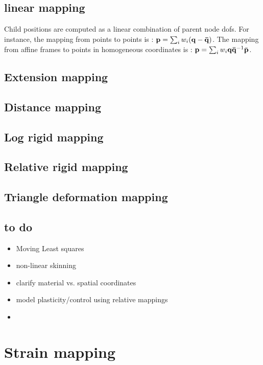 \subsection{linear mapping}

Child positions are computed as a linear combination of parent node dofs.
For instance, the mapping from points to points is : $\mathbf{{p}} = \sum_i w_i (\mathbf{{q}} - \mathbf{{\bar{q}}})$.
The mapping from affine frames to points in homogeneous coordinates is : $\mathbf{{p}} = \sum_i w_i \mathbf{{q}} \mathbf{{\bar{q}}}^{-1} \bar{\mathbf{{p}}}$.

\subsection{Extension mapping}

\subsection{Distance mapping}

\subsection{Log rigid mapping}

\subsection{Relative rigid mapping}

\subsection{Triangle deformation mapping}

\subsection{to do}

\begin{itemize}
 \item Moving Least squares
 \item non-linear skinning
 \item clarify material vs. spatial coordinates
 \item model plasticity/control using relative mappings
 \item 
\end{itemize}

\newpage
\section{Strain mapping}

